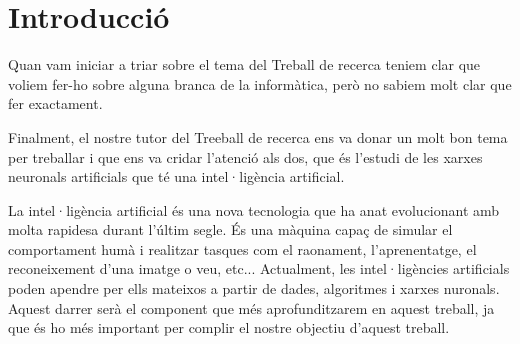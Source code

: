\chapter{Introducció}
\label{c:intro}
Quan vam iniciar a triar sobre el tema del Treball de recerca teniem clar que voliem fer-ho sobre alguna branca de la informàtica, però no sabiem molt clar que fer exactament.

Finalment, el nostre tutor del Treeball de recerca ens va donar un molt bon tema per treballar i que ens va cridar l'atenció als dos, que és l'estudi de les xarxes neuronals artificials que té una intel·ligència artificial.

La intel·ligència artificial és una nova tecnologia que ha anat evolucionant amb molta rapidesa durant l'últim segle. És una màquina capaç de simular el comportament humà i realitzar tasques com el raonament, l'aprenentatge, el reconeixement d'una imatge o veu, etc... Actualment, les intel·ligències artificials poden apendre per ells mateixos a partir de dades, algoritmes i xarxes nuronals. Aquest darrer serà el component que més aprofunditzarem en aquest treball, ja que és ho més important per complir el nostre objectiu d'aquest treball.
